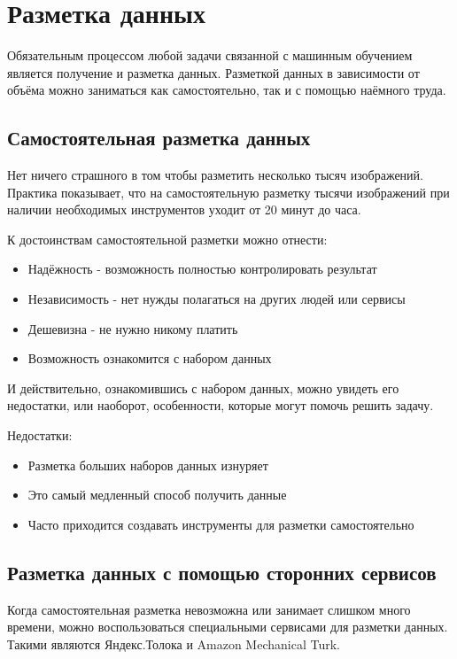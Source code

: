 \section{Разметка данных} \label{sect1_4}
Обязательным процессом любой задачи связанной с машинным обучением является получение и разметка данных. Разметкой данных в зависимости от объёма можно заниматься как самостоятельно, так и с помощью наёмного труда. 

\subsection{Самостоятельная разметка данных} \label{subsect1_3_1}
Нет ничего страшного в том чтобы разметить несколько тысяч изображений. Практика показывает, что на самостоятельную разметку тысячи изображений при наличии необходимых инструментов уходит от 20 минут до часа.

К достоинствам самостоятельной разметки можно отнести:
\begin{itemize}
    \item Надёжность - возможность полностью контролировать результат
    \item Независимость - нет нужды полагаться на других людей или сервисы
    \item Дешевизна - не нужно никому платить
    \item Возможность ознакомится с набором данных
\end{itemize}
И действительно, ознакомившись с набором данных, можно увидеть его недостатки, или наоборот, особенности, которые могут помочь решить задачу.

Недостатки:
\begin{itemize}
    \item Разметка больших наборов данных изнуряет
    \item Это самый медленный способ получить данные
    \item Часто приходится создавать инструменты для разметки самостоятельно
\end{itemize}


\subsection{Разметка данных с помощью сторонних сервисов} \label{subsect1_4_2}
Когда самостоятельная разметка невозможна или занимает слишком много времени, можно воспользоваться специальными сервисами для разметки данных. Такими являются Яндекс.Толока и Amazon Mechanical Turk.


